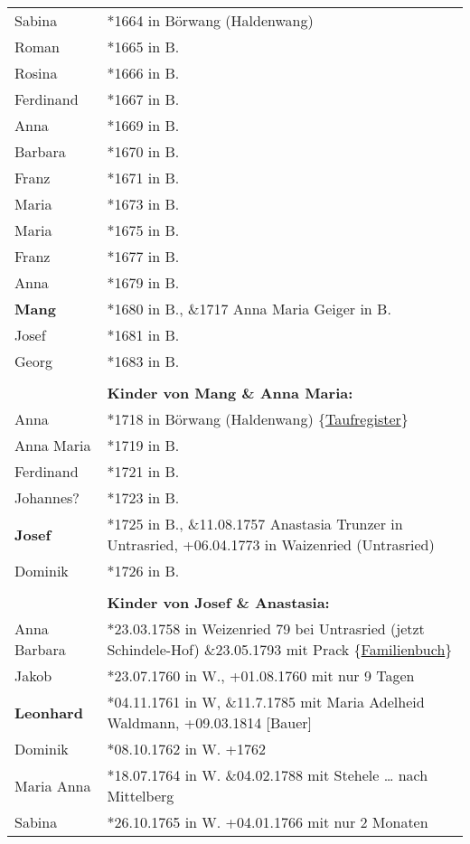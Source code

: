 \documentclass[
]{article}
\begin{document}
\begin{longtable}[]{@{}ll@{}}
Sabina & *1664 in Börwang (Haldenwang) \\
Roman & *1665 in B. \\
Rosina & *1666 in B. \\
Ferdinand & *1667 in B. \\
Anna & *1669 in B. \\
Barbara & *1670 in B. \\
Franz & *1671 in B. \\
Maria & *1673 in B. \\
Maria & *1675 in B. \\
Franz & *1677 in B. \\
Anna & *1679 in B. \\
\textbf{Mang} & *1680 in B., \&1717 Anna Maria Geiger in B. \\
Josef & *1681 in B. \\
Georg & *1683 in B. \\
& \\
& \textbf{Kinder von Mang \& Anna Maria:} \\
Anna & *1718 in Börwang (Haldenwang)
\{\href{https://data.matricula-online.eu/de/deutschland/augsburg/haldenwang-bei-kempten/3-T/?pg=34}{Taufregister}\} \\
Anna Maria & *1719 in B. \\
Ferdinand & *1721 in B. \\
Johannes? & *1723 in B. \\
\textbf{Josef} & *1725 in B., \&11.08.1757 Anastasia Trunzer in
Untrasried, +06.04.1773 in Waizenried (Untrasried) \\
Dominik & *1726 in B. \\
& \\
& \textbf{Kinder von Josef \& Anastasia:} \\
Anna Barbara & *23.03.1758 in Weizenried 79 bei Untrasried (jetzt
Schindele-Hof) \&23.05.1793 mit Prack
\{\href{https://data.matricula-online.eu/de/deutschland/augsburg/untrasried/16-FB/?pg=99}{Familienbuch}\} \\
Jakob & *23.07.1760 in W., +01.08.1760 mit nur 9 Tagen \\
\textbf{Leonhard} & *04.11.1761 in W, \&11.7.1785 mit Maria Adelheid
Waldmann, +09.03.1814 {[}Bauer{]} \\
Dominik & *08.10.1762 in W. +1762 \\
Maria Anna & *18.07.1764 in W. \&04.02.1788 mit Stehele \ldots{} nach
Mittelberg \\
Sabina & *26.10.1765 in W. +04.01.1766 mit nur 2 Monaten \\

\end{longtable}
\end{document}
